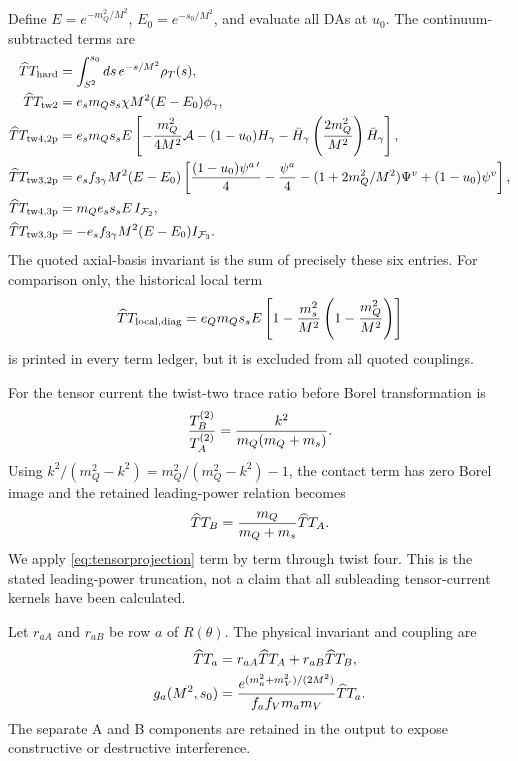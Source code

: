 \documentclass[11pt,a4paper]{article}
\newcommand{\Twide}{\widehat T}
\begin{document}
Define $E=e^{-m_Q^2/M^2}$, $E_0=e^{-s_0/M^2}$, and evaluate all DAs at
$u_0$.  The continuum-subtracted terms are
\begin{align}
\Twide T_{\rm hard}&=\int_{S^2}^{s_0}ds\,e^{-s/M^2}\rho_T(s),\\
\Twide T_{\rm tw2}&=e_sm_Qs_s\chi M^2(E-E_0)\phi_\gamma,\\
\Twide T_{\rm tw4,2p}&=e_sm_Qs_sE\left[
-{m_Q^2\over4M^2}{\cal A}
-(1-u_0)H_\gamma-\bar H_\gamma
\left({2m_Q^2\over M^2}\right)\bar H_\gamma\right],\\
\Twide T_{\rm tw3,2p}&=e_sf_{3\gamma}M^2(E-E_0)
\left[{(1-u_0)\psi^{a\,\prime}\over4}-{\psi^a\over4}
-(1+2m_Q^2/M^2)\Psi^v+(1-u_0)\psi^v\right],\\
\Twide T_{\rm tw4,3p}&=m_Qe_ss_sE\,I_{{\cal F}_2},\\
\Twide T_{\rm tw3,3p}&=-e_sf_{3\gamma}M^2(E-E_0)I_{{\cal F}_3}.
\label{eq:postterms}
\end{align}
The quoted axial-basis invariant is the sum of precisely these six entries.
For comparison only, the historical local term
\begin{equation}
\Twide T_{\rm local,diag}=e_Qm_Qs_sE
\left[1-{m_s^2\over M^2}\left(1-{m_Q^2\over M^2}\right)\right]
\end{equation}
is printed in every term ledger, but it is excluded from all quoted
couplings.

For the tensor current the twist-two trace ratio before Borel transformation
is
\begin{equation}
{T_B^{(2)}\over T_A^{(2)}}={k^2\over m_Q(m_Q+m_s)}.
\end{equation}
Using $k^2/(m_Q^2-k^2)=m_Q^2/(m_Q^2-k^2)-1$, the contact term has zero Borel
image and the retained leading-power relation becomes
\begin{equation}
\Twide T_B={m_Q\over m_Q+m_s}\Twide T_A.
\label{eq:tensorprojection}
\end{equation}
We apply \cref{eq:tensorprojection} term by term through twist four.  This is
the stated leading-power truncation, not a claim that all subleading
tensor-current kernels have been calculated.

Let $r_{aA}$ and $r_{aB}$ be row $a$ of $R(\theta)$.  The physical invariant
and coupling are
\begin{align}
\Twide T_a&=r_{aA}\Twide T_A+r_{aB}\Twide T_B,\\
g_a(M^2,s_0)&={e^{(m_a^2+m_V^2)/(2M^2)}
\over f_af_Vm_am_V}\Twide T_a .
\label{eq:coupling}
\end{align}
The separate A and B components are retained in the output to expose
constructive or destructive interference.
\end{document}
